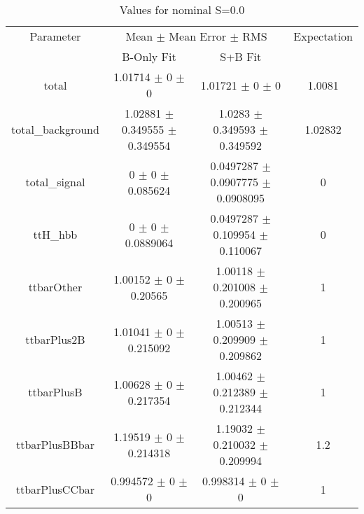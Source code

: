 \begin{table}
\centering
\caption{Values for nominal S=0.0}
\begin{tabular}{cccc}
\toprule
Parameter & \multicolumn{2}{c}{Mean $\pm$ Mean Error $\pm$ RMS} & Expectation\\
 & B-Only Fit & S+B Fit & \\
\midrule
total & \num{1.01714} $\pm$ \num{0} $\pm$ \num{0} & \num{1.01721} $\pm$ \num{0} $\pm$ \num{0} & \num{1.0081}\\
total\_background & \num{1.02881} $\pm$ \num{0.349555} $\pm$ \num{0.349554} & \num{1.0283} $\pm$ \num{0.349593} $\pm$ \num{0.349592} & \num{1.02832}\\
total\_signal & \num{0} $\pm$ \num{0} $\pm$ \num{0.085624} & \num{0.0497287} $\pm$ \num{0.0907775} $\pm$ \num{0.0908095} & \num{0}\\
ttH\_hbb & \num{0} $\pm$ \num{0} $\pm$ \num{0.0889064} & \num{0.0497287} $\pm$ \num{0.109954} $\pm$ \num{0.110067} & \num{0}\\
ttbarOther & \num{1.00152} $\pm$ \num{0} $\pm$ \num{0.20565} & \num{1.00118} $\pm$ \num{0.201008} $\pm$ \num{0.200965} & \num{1}\\
ttbarPlus2B & \num{1.01041} $\pm$ \num{0} $\pm$ \num{0.215092} & \num{1.00513} $\pm$ \num{0.209909} $\pm$ \num{0.209862} & \num{1}\\
ttbarPlusB & \num{1.00628} $\pm$ \num{0} $\pm$ \num{0.217354} & \num{1.00462} $\pm$ \num{0.212389} $\pm$ \num{0.212344} & \num{1}\\
ttbarPlusBBbar & \num{1.19519} $\pm$ \num{0} $\pm$ \num{0.214318} & \num{1.19032} $\pm$ \num{0.210032} $\pm$ \num{0.209994} & \num{1.2}\\
ttbarPlusCCbar & \num{0.994572} $\pm$ \num{0} $\pm$ \num{0} & \num{0.998314} $\pm$ \num{0} $\pm$ \num{0} & \num{1}\\
\bottomrule
\end{tabular}
\end{table}